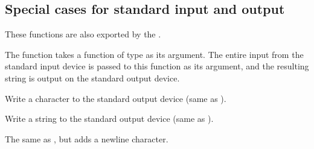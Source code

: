 \subsection{Special cases for standard input and output}
These functions are also exported by the .\par
\begin{haddockdesc}
\item[\begin{tabular}{@{}l}
interact :: (String -> String) -> IO ()
\end{tabular}]
{\haddockbegindoc
The  function takes a function of type 
 as its argument.  The entire input from the standard input device is
 passed to this function as its argument, and the resulting string is
 output on the standard output device.\par}
\end{haddockdesc}
\begin{haddockdesc}
\item[\begin{tabular}{@{}l}
putChar :: Char -> IO ()
\end{tabular}]
{\haddockbegindoc
Write a character to the standard output device
 (same as  ).\par}
\end{haddockdesc}
\begin{haddockdesc}
\item[\begin{tabular}{@{}l}
putStr :: String -> IO ()
\end{tabular}]
{\haddockbegindoc
Write a string to the standard output device
 (same as  ).\par}
\end{haddockdesc}
\begin{haddockdesc}
\item[\begin{tabular}{@{}l}
putStrLn :: String -> IO ()
\end{tabular}]
{\haddockbegindoc
The same as , but adds a newline character.\par}
\end{haddockdesc}
